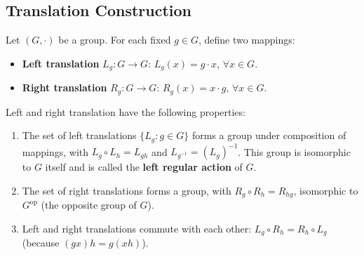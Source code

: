\subsection{\texorpdfstring{Translation Construction}{Translation Construction}}

\begin{definition}\label{def:group_translation_operation}
Let $(G,\cdot)$ be a group. For each fixed $g \in G$, define two mappings:
\begin{itemize}
    \item \textbf{Left translation} $L_g: G \to G$: $L_g(x) = g \cdot x$, $\forall x \in G$.
    \item \textbf{Right translation} $R_g: G \to G$: $R_g(x) = x \cdot g$, $\forall x \in G$.
\end{itemize}
Left and right translation have the following properties:
\begin{enumerate}[label=(\roman*)]
    \item The set of left translations $\{L_g : g \in G\}$ forms a group under composition of mappings, with $L_g \circ L_h = L_{gh}$ and $L_{g^{-1}} = (L_g)^{-1}$. This group is isomorphic to $G$ itself and is called the \textbf{left regular action} of $G$.
    \item The set of right translations forms a group, with $R_g \circ R_h = R_{hg}$, isomorphic to $G^{\text{op}}$ (the opposite group of $G$).
    \item Left and right translations commute with each other: $L_g \circ R_h = R_h \circ L_g$ (because $(gx)h = g(xh)$).
\end{enumerate}
\end{definition}

